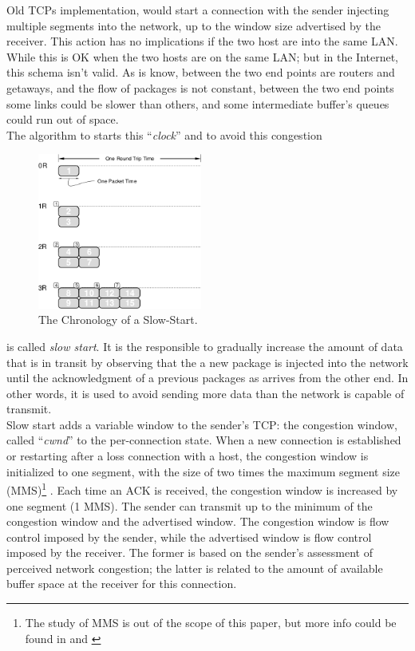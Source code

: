 \indent Old TCPs implementation, would start a connection with the sender injecting multiple segments into the network, up to the window size advertised by the receiver.  This action has no implications if the two host are into the same LAN. While this is OK when the two hosts are on the same LAN; but in the Internet, this schema isn't valid. As is know, between the two end points are routers and getaways, and the flow of packages is not constant, between the two end points some links could be slower than others, and some intermediate buffer's queues could run out of space.\\

The algorithm to starts this ``\textit{clock}'' and to avoid this congestion
 \begin{figure}
  \begin{center}
    \includegraphics[width=0.48\textwidth]{img/slowstart}
  \end{center}
  \caption{The Chronology of a Slow-Start.\cite{Jacobson:1988:CAC:52325.52356}}
  \label{slowstart}
\end{figure}
is called \textit{slow start}. It is the responsible to gradually increase the amount of data that is in transit by observing that the a new package is injected into the network until the acknowledgment of a previous packages as arrives from the other end. In other words, it is used to avoid sending more data than the network is capable of transmit.\\

Slow start adds a variable window to the sender's TCP:  the congestion window, called ``\textit{cwnd}'' to the per-connection state.  When a new connection is established or restarting after a loss connection with a host, the congestion window is initialized to one segment, with the size of two times the maximum segment size (MMS)\footnote{The study of MMS is out of the scope of this paper, but more info could be found in \cite{rfc879} and \cite{rfc2460}} .  Each time an ACK is received, the congestion window is increased by one segment (1 MMS).  The sender can transmit up to the minimum of the congestion window and the advertised window.  The congestion window is flow control imposed by the sender, while the advertised window is flow control imposed by the receiver.  The former is based on the sender's assessment of perceived network congestion; the latter is related to the amount of available buffer space at the receiver for this connection.\\

